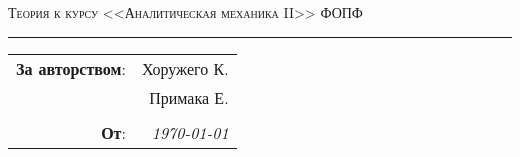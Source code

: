 
\begin{center}
    \LARGE \textsc{Теория к курсу <<Аналитическая механика II>> ФОПФ}
\end{center}

\hrule

\phantom{42}

\begin{flushright}
    \begin{tabular}{rr}
        \textbf{За авторством}: 
        & Хоружего К. \\
        & Примака Е. \\
        &\\
        \textbf{От}: &
        \textit{\today}\\
    \end{tabular}
\end{flushright}

\thispagestyle{empty}
\tableofcontents
\newpage